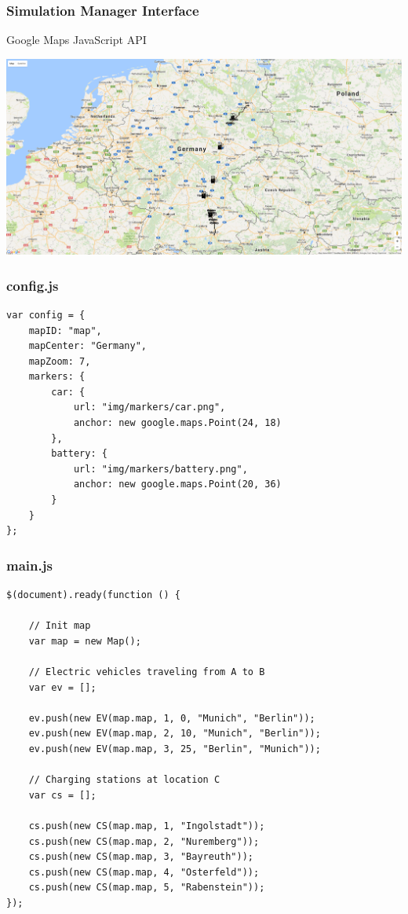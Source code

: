 \begin{frame}
\frametitle{Simulation Manager Interface}

Google Maps JavaScript API \\

\vspace*{-3mm}
\begin{minipage}[t][0cm]{\paperwidth}%
\hspace*{-\PraesentationSeitenrand}%
\includegraphics[width=\paperwidth]{images/simulation_manager.png}
\end{minipage}

\end{frame}
\clearpage



\begin{frame}[fragile]
\frametitle{config.js}

\begin{verbatim}
var config = {
    mapID: "map",
    mapCenter: "Germany",
    mapZoom: 7,
    markers: {
        car: {
            url: "img/markers/car.png",
            anchor: new google.maps.Point(24, 18)
        },
        battery: {
            url: "img/markers/battery.png",
            anchor: new google.maps.Point(20, 36)
        }
    }
};
\end{verbatim}

\end{frame}
\clearpage



\begin{frame}[fragile]
\frametitle{main.js}

\begin{verbatim}
$(document).ready(function () {

    // Init map
    var map = new Map();

    // Electric vehicles traveling from A to B
    var ev = [];

    ev.push(new EV(map.map, 1, 0, "Munich", "Berlin"));
    ev.push(new EV(map.map, 2, 10, "Munich", "Berlin"));
    ev.push(new EV(map.map, 3, 25, "Berlin", "Munich"));

    // Charging stations at location C
    var cs = [];

    cs.push(new CS(map.map, 1, "Ingolstadt"));
    cs.push(new CS(map.map, 2, "Nuremberg"));
    cs.push(new CS(map.map, 3, "Bayreuth"));
    cs.push(new CS(map.map, 4, "Osterfeld"));
    cs.push(new CS(map.map, 5, "Rabenstein"));
});
\end{verbatim}

\end{frame}
\clearpage